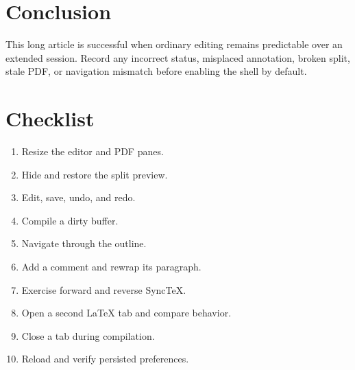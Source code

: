 \documentclass[11pt]{article}
\begin{document}
\section{Conclusion}
This long article is successful when ordinary editing remains predictable over
an extended session. Record any incorrect status, misplaced annotation, broken
split, stale PDF, or navigation mismatch before enabling the shell by default.

\appendix
\section{Checklist}
\begin{enumerate}
  \item Resize the editor and PDF panes.
  \item Hide and restore the split preview.
  \item Edit, save, undo, and redo.
  \item Compile a dirty buffer.
  \item Navigate through the outline.
  \item Add a comment and rewrap its paragraph.
  \item Exercise forward and reverse SyncTeX.
  \item Open a second LaTeX tab and compare behavior.
  \item Close a tab during compilation.
  \item Reload and verify persisted preferences.
\end{enumerate}
\end{document}
